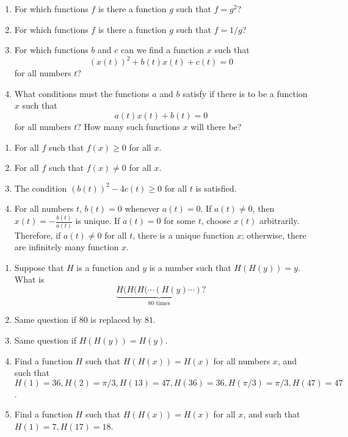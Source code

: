 \begin{pr} \label{3.10}
  \begin{enumerate}[label = (\alph*)]
    \item For which functions $f$ is there a function $g$ such that $f = g^2$?
    \item For which functions $f$ is there a function $g$ such that $f = 1/g$?
    \item For which functions $b$ and $c$ can we find a function $x$ such that
    \begin{equation*}
      (x(t))^2 + b(t)x(t) + c(t) = 0
    \end{equation*}
    for all numbers $t$?
    \item What conditions must the functions $a$ and $b$ satisfy if there is to
    be a function $x$ such that
    \begin{equation*}
      a(t)x(t) + b(t) = 0
    \end{equation*}
    for all numbers $t$? How many such functions $x$ will there be?
  \end{enumerate}
\end{pr}

\begin{solution}
  \begin{enumerate}[label = (\alph*)]
    \item For all $f$ such that $f(x) \geq 0$ for all $x$.
    \item For all $f$ such that $f(x) \neq 0$ for all $x$.
    \item The condition $(b(t))^2 - 4c(t) \geq 0$ for all $t$ is satisfied.
    \item For all numbers $t$, $b(t) = 0$ whenever $a(t) = 0$. If $a(t) \neq 0$,
    then $x(t) = \displaystyle-\frac{b(t)}{a(t)}$ is unique. If $a(t) = 0$ for
    some $t$, choose $x(t)$ arbitrarily. Therefore, if $a(t) \neq 0$ for all $t$,
    there is a unique function $x$; otherwise, there are infinitely many function $x$.
  \end{enumerate}
\end{solution}

\begin{pr} \label{3.11}
  \begin{enumerate}[label = (\alph*)]
    \item Suppose that $H$ is a function and $y$ is a number such that $H(H(y)) = y$.
    What is
    \begin{equation*}
      \underbrace{H(H(H(\cdots(H(y)\cdots)}_\text{$80$ times} ?
    \end{equation*}
    \item Same question if $80$ is replaced by $81$.
    \item Same question if $H(H(y)) = H(y)$.
    \item Find a function $H$ such that $H(H(x)) = H(x)$ for all numbers $x$, and
    such that $H(1) = 36, H(2) = \pi/3, H(13) = 47, H(36) = 36, H(\pi/3) = \pi/3,
    H(47) = 47$.
    \item Find a function $H$ such that $H(H(x)) = H(x)$ for all $x$, and such that
    $H(1) = 7, H(17) = 18$.
  \end{enumerate}
\end{pr}

